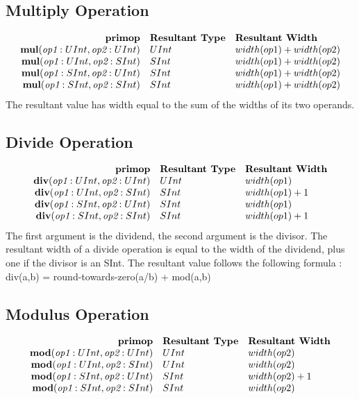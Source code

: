 \documentclass[12pt]{article}
\begin{document}
\subsection{Multiply Operation}
\[
\begin{array}{rll}
\text{\bf primop} & \text{\bf Resultant Type} & \text{\bf Resultant Width} \\
\text{\bf mul}(\text{\em op1}:UInt, \text{\em op2}:UInt) &   UInt & width(op1) + width(op2)  \\
\text{\bf mul}(\text{\em op1}:UInt, \text{\em op2}:SInt) &   SInt & width(op1) + width(op2)  \\
\text{\bf mul}(\text{\em op1}:SInt, \text{\em op2}:UInt) &   SInt & width(op1) + width(op2)  \\
\text{\bf mul}(\text{\em op1}:SInt, \text{\em op2}:SInt) &   SInt & width(op1) + width(op2)  \\
\end{array}
\]
The resultant value has width equal to the sum of the widths of its two operands.

\subsection{Divide Operation}
\[
\begin{array}{rll}
\text{\bf primop} & \text{\bf Resultant Type} & \text{\bf Resultant Width} \\
\text{\bf div}(\text{\em op1}:UInt, \text{\em op2}:UInt) &   UInt & width(op1)     \\
\text{\bf div}(\text{\em op1}:UInt, \text{\em op2}:SInt) &   SInt & width(op1) + 1  \\
\text{\bf div}(\text{\em op1}:SInt, \text{\em op2}:UInt) &   SInt & width(op1)     \\
\text{\bf div}(\text{\em op1}:SInt, \text{\em op2}:SInt) &   SInt & width(op1) + 1  \\
\end{array}
\]
The first argument is the dividend, the second argument is the divisor.
The resultant width of a divide operation is equal to the width of the dividend, plus one if the divisor is an SInt.
The resultant value follows the following formula : div(a,b) = round-towards-zero(a/b) + mod(a,b)

\subsection{Modulus Operation}
\[
\begin{array}{rll}
\text{\bf primop} & \text{\bf Resultant Type} & \text{\bf Resultant Width} \\
\text{\bf mod}(\text{\em op1}:UInt, \text{\em op2}:UInt) &   UInt & width(op2)     \\
\text{\bf mod}(\text{\em op1}:UInt, \text{\em op2}:SInt) &   UInt & width(op2)     \\
\text{\bf mod}(\text{\em op1}:SInt, \text{\em op2}:UInt) &   SInt & width(op2) + 1 \\
\text{\bf mod}(\text{\em op1}:SInt, \text{\em op2}:SInt) &   SInt & width(op2)     \\
\end{array}
\]
\end{document}
